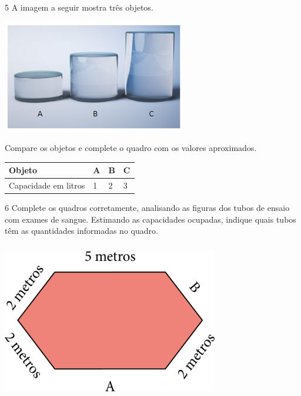 
\num{5} A imagem a seguir mostra três objetos.


\includegraphics[width=3.14583in,height=1.94792in]{media/image46.png}

Compare os objetos e complete o quadro com os valores aproximados.

\begin{longtable}[]{@{}llll@{}}
\toprule
Objeto & A & B & C\tabularnewline
\midrule
\endhead
Capacidade em litros & 1 & 2 & 3\tabularnewline
\bottomrule
\end{longtable}


\num{6} Complete os quadros corretamente, analisando as figuras dos tubos de
ensaio com exames de sangue. Estimando as capacidades ocupadas, indique
quais tubos têm as quantidades informadas no quadro.


\includegraphics[width=3.71875in,height=2.70833in]{media/image47.png}

